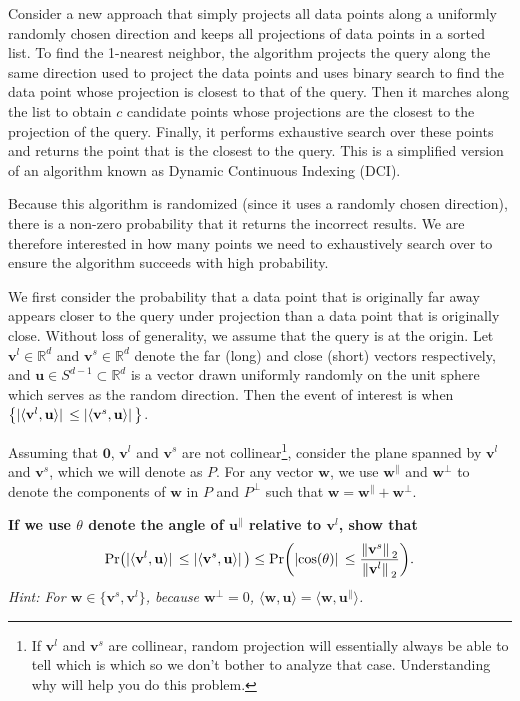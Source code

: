 \documentclass{article}
\renewcommand{\vec}[1]{\boldsymbol{\mathbf{#1}}}
\begin{document}
\begin{enumerate}[(a)]
    Consider a new approach that simply projects all data points along a uniformly randomly chosen direction and keeps all projections of data points in a sorted list. 
    To find the 1-nearest neighbor, the algorithm projects the query along the same direction used to project the data points and uses binary search to find the data point whose projection is closest to that of the query. 
    Then it marches along the list to obtain $c$ candidate points whose projections are the closest to the projection of the query. 
    Finally, it performs exhaustive search over these points and returns the point that is the closest to the query. 
    This is a simplified version of an algorithm known as Dynamic Continuous Indexing (DCI).
    
    Because this algorithm is randomized (since it uses a randomly chosen direction), there is a non-zero probability that it returns the incorrect results. 
    We are therefore interested in how many points we need to exhaustively search over to ensure the algorithm succeeds with high probability.
    
    We first consider the probability that a data point that is originally far away appears closer to the query under projection than a data point that is originally close. 
    Without loss of generality, we assume that the query is at the origin. 
    Let $\vec{v}^{l} \in \mathbb{R}^{d}$ and $\vec{v}^{s} \in \mathbb{R}^{d}$ denote the far (long) and close (short) vectors respectively, and $\vec{u}\in S^{d-1}\subset\mathbb{R}^{d}$ is a vector drawn uniformly randomly on the unit sphere which serves as the random direction.
    Then the event of interest is when $\qty{\abs*{\langle\vec{v}^{l}, \vec{u}\rangle} \leq \abs*{\langle\vec{v}^{s}, \vec{u}\rangle}}$.
    
    Assuming that $\vec{0}$, $\vec{v}^{l}$ and $\vec{v}^{s}$ are not collinear\footnote{If $\vec{v}^{l}$ and $\vec{v}^{s}$ are collinear, random projection will essentially always be able to tell which is which so we don't bother to analyze that case. Understanding why will help you do this problem.}, consider the plane spanned by $\vec{v}^{l}$ and $\vec{v}^{s}$, which we will denote as $P$.
    For any vector $\vec{w}$, we use $\vec{w}^{\parallel}$ and $\vec{w}^{\perp}$ to denote the components of $\vec{w}$ in $P$ and $P^{\perp}$ such that $\vec{w}=\vec{w}^{\parallel}+\vec{w}^{\perp}$. 
    
    {\bf If we use $\theta$ denote the angle of $\vec{u}^{\parallel}$ relative to $\vec{v}^{l}$, show that 
    \[
        \mathrm{Pr}\qty(\abs*{\langle\vec{v}^{l}, \vec{u}\rangle} \leq \abs*{\langle\vec{v}^{s}, \vec{u}\rangle}) \leq \mathrm{Pr}\qty(\abs*{\cos(\theta)} \leq \frac{\norm*{\vec{v}^{s}}_{2}}{\norm*{\vec{v}^{l}}_{2}}).
    \]
    }
    \emph{Hint: For $\vec{w} \in \{\vec{v}^{s}, \vec{v}^{l}\}$, because $\vec{w}^{\perp} = 0$, $\langle \vec{w}, \vec{u} \rangle = \langle \vec{w}, \vec{u}^{\parallel} \rangle$.}
    

\end{enumerate}
\end{document}
